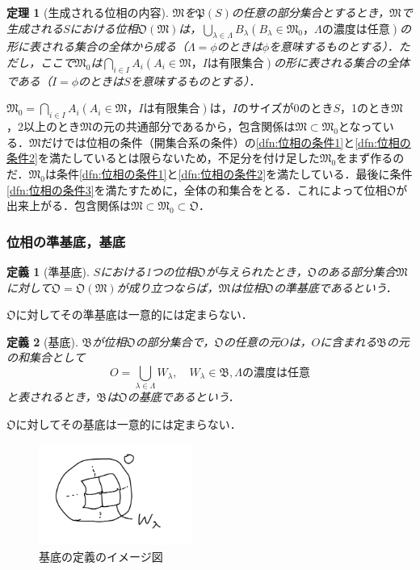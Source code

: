 \documentclass[a4paper,10pt,uplatex]{jsarticle}
\numberwithin{equation}{section}
\theoremstyle{mystyle}
\newtheorem{dfn}{定義}[section]
\newtheorem{thm}{定理}[section]
\newcommand{\gB}{\mathfrak{B}}
\newcommand{\gM}{\mathfrak{M}}
\newcommand{\gO}{\mathfrak{O}}
\newcommand{\gP}{\mathfrak{P}}
\begin{document}
\begin{thm}[生成される位相の内容]
    $\gM$を$\gP(S)$の任意の部分集合とするとき，$\gM$で生成される$S$における位相$\gO(\gM)$は，$\bigcup_{\lambda \in \Lambda}B_\lambda (B_\lambda \in \gM_0，\Lambda の濃度は任意)$の形に表される集合の全体から成る（$\Lambda = \phi$のときは$\phi$を意味するものとする）．ただし，ここで$\gM_0$は$\bigcap_{i \in I} A_i (A_i \in \gM，Iは有限集合)$の形に表される集合の全体である（$I = \phi$のときは$S$を意味するものとする）．
\end{thm}

$\gM_0 = \bigcap_{i \in I} A_i (A_i \in \gM，Iは有限集合)$は，$I$のサイズが0のとき$S$，1のとき$\gM$，2以上のとき$\gM$の元の共通部分であるから，包含関係は$\gM \subset \gM_0$となっている．$\gM$だけでは位相の条件（開集合系の条件）の\ref{dfn:位相の条件1}と\ref{dfn:位相の条件2}を満たしているとは限らないため，不足分を付け足した$\gM_0$をまず作るのだ．$\gM_0$は条件\ref{dfn:位相の条件1}と\ref{dfn:位相の条件2}を満たしている．最後に条件\ref{dfn:位相の条件3}を満たすために，全体の和集合をとる．これによって位相$\gO$が出来上がる．包含関係は$\gM \subset \gM_0 \subset \gO$．

\subsubsection{位相の準基底，基底}
\begin{dfn}[準基底]
    $S$における1つの位相$\gO$が与えられたとき，$\gO$のある部分集合$\gM$に対して$\gO = \gO(\gM)$が成り立つならば，$\gM$は位相$\gO$の準基底であるという．
\end{dfn}
$\gO$に対してその準基底は一意的には定まらない．

\begin{dfn}[基底]
    $\gB$が位相$\gO$の部分集合で，$\gO$の任意の元$O$は，$O$に含まれる$\gB$の元の和集合として
    \begin{equation}
        O = \bigcup_{\lambda \in \Lambda} W_\lambda, \quad W_\lambda \in \gB, \Lambda の濃度は任意
    \end{equation}
    と表されるとき，$\gB$は$\gO$の基底であるという．
\end{dfn}
$\gO$に対してその基底は一意的には定まらない．

\begin{figure}[h]
    \begin{center}
    \includegraphics[width = 50mm]{基底.jpeg}
    \caption{基底の定義のイメージ図}
    \end{center}
\end{figure}
\end{document}
